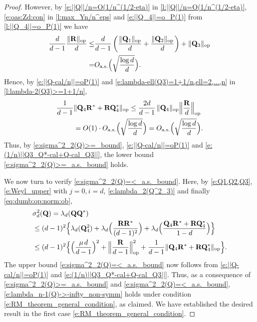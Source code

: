 \documentclass[9pt,twocolumn,twoside]{pnas-new}
\newcommand{\?}{\textbf{?}}
\newcommand{\op}{\textnormal{op}}
\newcommand{\as}{\textnormal{a.s.}}
\newcommand{\QQ}{\mathbf{Q}}
\newcommand{\RM}{\mathbf{R}}
\begin{document}
\begin{proof}
However, by  \eqref{e:||Q||/n=O(1/n^(1/2-eta)} in \cref{l:||Q||/n=O(1/n^(1/2-eta)},  \eqref{e:oas:Zd:con} in \cref{l:max_Yn/n^eps}
and \eqref{e:||Q_4||=o_P(1)} from \cref{l:||Q_4||=o_P(1)}
we have
\begin{align}
  \frac{d}{d-1}  \frac{\|\RM\|_{\op}}{d}
  \leq& \frac{d}{d-1} \left(\frac{\|\QQ_1\|_{\op}}{d} +
  \frac{\|\QQ_2\|_{\op}}{d}\right) + \|\QQ_3\|_{\op}
  \notag\\
       =& O_{\as}\Big(\sqrt{ \frac{\log d}{d}}\Big).
        \label{e:||Q-cal/n||=oP(1)}
\end{align}
Hence, by \eqref{e:||Q-cal/n||=oP(1)} and
\eqref{e:lambda-ell(Q3)=1+1/n,ell=2,...,n} in
\cref{l:lambda-2(Q3)>=1+1/n},
\begin{align}
  \frac{1}{d-1} &\|\QQ_4\RM^*+ \RM\QQ^*_4\|_{\op}
  \leq \frac{2d}{d-1} \hspace{0.5mm} \|\QQ_4 \|_{\op} \Big\|\frac{\RM}{d} \Big\|_{\op}
  \notag\\
 &=  O(1) \cdot O_{\as}\Big(\sqrt{ \frac{\log d}{d}}\Big)
  = O_{\as}\Big(\sqrt{ \frac{\log d}{d}}\Big).
  \label{e:(1/n)||Q3_Q*-cal+Q-cal_Q3||}
\end{align}
Thus, by \eqref{e:sigma^2_2(Q)>=_bound}, \eqref{e:||Q-cal/n||=oP(1)} and \eqref{e:(1/n)||Q3_Q*-cal+Q-cal_Q3||}, the lower bound \eqref{e:sigma^2_2(Q)>=_a.s._bound} holds.

We now turn to verify \eqref{e:sigma^2_2(Q)=<_a.s._bound}. Here, by
\eqref{e:Q1,Q2,Q3}, \eqref{e:Weyl_upper} with $j = 0, i = d$, 
\eqref{e:lambda_2(Q^2_3)} and finally \eqref{eq:dumb:op:norm:ob},
\begin{align*}
  &\sigma^2_d(\QQ)
  = \lambda_d(\QQ \QQ^*)
  \notag\\
   &\leq (d-1)^2 \Big\{ \lambda_{d}(\QQ^2_4)
     + \lambda_{d}\Big(\frac{{\mathbf R}{\mathbf R}^*}{(d-1)^2}\Big) +
     \lambda_d\Big(\frac{\QQ_4{\mathbf R}^*+ {\mathbf R}\QQ^*_4}{1-d} \Big) \Big\}
     \notag\\
  &\leq (d-1)^2 \Big\{ \Big(\frac{\mu \hspace{0.5mm} d}{d-1}\Big)^2
    + \Big\|  \frac{{\mathbf R}}{d-1}\Big\|^2_{\op}
    + \frac{1}{d-1} \|\QQ_4{\mathbf R}^*+ {\mathbf R}\QQ^*_4\|_{\op}\Big\}.
\end{align*}
The upper bound \eqref{e:sigma^2_2(Q)=<_a.s._bound} now follows from
\eqref{e:||Q-cal/n||=oP(1)} and \eqref{e:(1/n)||Q3_Q*-cal+Q-cal_Q3||}.
Thus, as a consequence of \eqref{e:sigma^2_2(Q)>=_a.s._bound} and
\eqref{e:sigma^2_2(Q)=<_a.s._bound},
\eqref{e:lambda_n-1(Q)->-infty_non-symm} holds under condition
\eqref{e:RM_theorem_general_condition}, as claimed.  We have
established the desired result in the first case \eqref{e:RM_theorem_general_condition}.


\end{proof}
\end{document}
